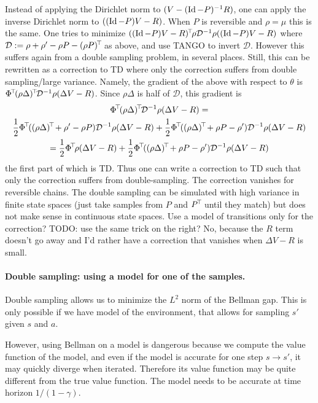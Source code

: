 \documentclass[11pt,a4paper]{article}
\newcommand{\Dir}{\mathcal{D}}
\begin{document}
Instead of applying the Dirichlet norm to $(V-(\operatorname{Id}-P)^{-1}R)$, one can
apply the inverse Dirichlet norm to $((\operatorname{Id}-P)V-R)$. When $P$ is
reversible and $\rho=\mu$ this
is the same. One tries to minimize
$\transp{((\Id-P)V-R)}\rho\Dir^{-1}\rho((\Id-P)V-R)$ where
$\Dir\deq \rho+\rho'-\rho P-\transp{(\rho P)}$ as above, and use
TANGO to invert $\Dir$. However this suffers again from a double
sampling problem, in several places. Still, this can be rewritten as a
correction to TD where only the correction suffers from double
sampling/large variance. Namely, the gradient of the above with respect
to $\theta$ is $\transp{\Phi}\transp{(\rho\Delta)} \Dir^{-1}\rho(\Delta V-R)$. Since
$\rho\Delta$ is half of $\Dir$, this gradient is 
\begin{gather}
\transp{\Phi}\transp{(\rho\Delta)} \Dir^{-1}\rho(\Delta V-R)=
\\
\frac12\transp{\Phi}(\transp{(\rho \Delta)}+\rho'-\rho P)\Dir^{-1}\rho(\Delta
V-R)+\frac12 \transp{\Phi}(\transp{(\rho \Delta)}+\rho P-\rho')\Dir^{-1}\rho(\Delta
V-R)
\\=\frac12\transp{\Phi}\rho(\Delta
V-R)+\frac12 \transp{\Phi}(\transp{(\rho \Delta)}+\rho P-\rho')\Dir^{-1}\rho(\Delta
V-R)
\end{gather}
the first part of which is TD. Thus one can write a correction to TD such
that only the correction suffers from double-sampling. The correction vanishes for reversible
chains. The double sampling can be simulated with high variance in finite
state spaces (just take samples from $P$ and $P^{\!\top}\!$ until they
match) but does not make sense in continuous state spaces. Use a model of
transitions only for the correction? TODO: use the same trick on the
right? No, because the $R$ term doesn't go away and I'd rather have a
correction that vanishes when $\Delta V-R$ is small.

\paragraph{Double sampling: using a model for one of the
samples.} Double sampling allows us to minimize the $L^2$ norm of the
Bellman gap. This is only possible if we have model of the environment,
that allows for sampling $s'$ given $s$ and $a$.

However, using Bellman on a model is dangerous because we compute the
value function of the model, and even if the model is accurate for one
step $s\to s'$, it may quickly diverge when iterated. Therefore its value
function may be quite different from the true value function. The model
needs to be accurate at time horizon $1/(1-\gamma)$.
\end{document}
